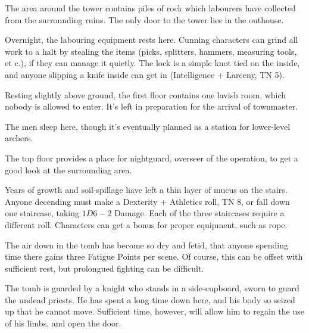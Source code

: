 \begin{multicols}{2}

The area around the tower contains piles of rock which labourers have collected from the surrounding ruins.  The only door to the tower lies in the outhouse.


\humanfarmer


Overnight, the labouring equipment rests here.  Cunning characters can grind all work to a halt by stealing the items (picks, splitters, hammers, measuring tools, et c.), if they can manage it quietly.  The lock is a simple knot tied on the inside, and anyone slipping a knife inside can get in (Intelligence + Larceny, TN 5).


Resting slightly above ground, the first floor contains one lavish room, which nobody is allowed to enter.  It's left in preparation for the arrival of \gls{townmaster}.

The men sleep here, though it's eventually planned as a station for lower-level archers.


The top floor provides a place for \gls{nightguard}, overseer of the operation, to get a good look at the surrounding area.




Years of growth and soil-spillage have left a thin layer of mucus on the stairs.  Anyone decending must make a Dexterity + Athletics roll, TN 8, or fall down one staircase, taking $1D6-2$ Damage.  Each of the three staircases require a different roll.  Characters can get a bonus for proper equipment, such as rope.

The air down in the tomb has become so dry and fetid, that anyone spending time there gains three Fatigue Points per scene.  Of course, this can be offset with sufficient rest, but prolongued fighting can be difficult.

The tomb is guarded by a knight who stands in a side-cupboard, sworn to guard the undead priests.
He has spent a long time down here, and his body so seized up that he cannot move.
Sufficient time, however, will allow him to regain the use of his limbs, and open the door.


\end{multicols}
